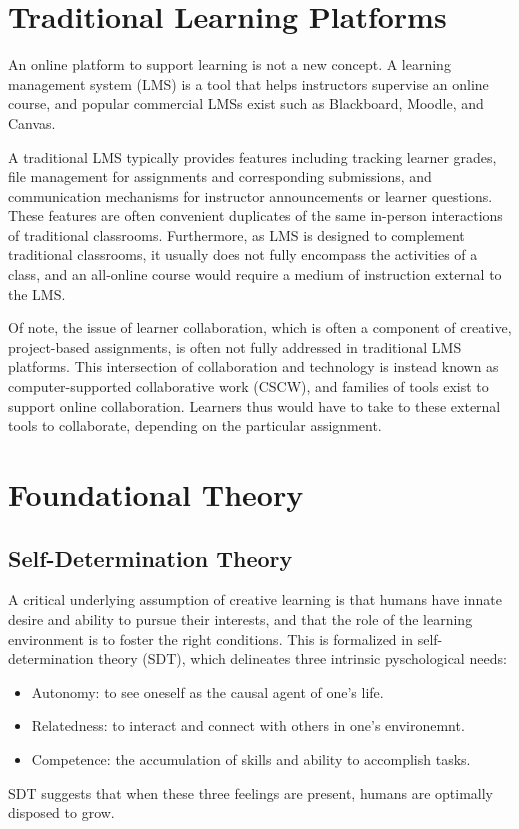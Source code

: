 \documentclass[12pt,twoside]{mitthesis}
\begin{document}
\section{Traditional Learning Platforms}

An online platform to support learning is not a new concept. A learning management system (LMS) is a tool that helps instructors supervise an online course, and popular commercial LMSs exist such as Blackboard, Moodle, and Canvas. 

A traditional LMS typically provides features including tracking learner grades, file management for assignments and corresponding submissions, and communication mechanisms for instructor announcements or learner questions. These features are often convenient duplicates of the same in-person interactions of traditional classrooms. Furthermore, as LMS is designed to complement traditional classrooms, it usually does not fully encompass the activities of a class, and an all-online course would require a medium of instruction external to the LMS.~\cite{zagalsky2015emergence}

Of note, the issue of learner collaboration, which is often a component of creative, project-based assignments, is often not fully addressed in traditional LMS platforms. This intersection of collaboration and technology is instead known as computer-supported collaborative work (CSCW), and families of tools exist to support online collaboration. Learners thus would have to take to these external tools to collaborate, depending on the particular assignment.

\section{Foundational Theory}

\subsection{Self-Determination Theory}

A critical underlying assumption of creative learning is that humans have innate desire and ability to pursue their interests, and that the role of the learning environment is to foster the right conditions. This is formalized in self-determination theory (SDT), which delineates three intrinsic pyschological needs:
\begin{itemize}
\item Autonomy: to see oneself as the causal agent of one's life.
\item Relatedness: to interact and connect with others in one's environemnt.
\item Competence: the accumulation of skills and ability to accomplish tasks.
\end{itemize}
SDT suggests that when these three feelings are present, humans are optimally disposed to grow.~\cite{ryan2000self}\cite{selfdetermination2}
\end{document}
